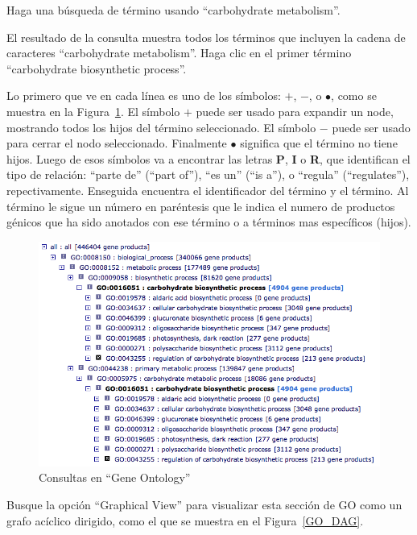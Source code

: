 \documentclass[letter,11pt]{book}
\begin{document}
Haga una búsqueda de término usando ``carbohydrate metabolism''.

El resultado de la consulta muestra todos los términos que incluyen la cadena de caracteres ``carbohydrate metabolism''.  Haga clic en el primer término ``carbohydrate biosynthetic process''.

Lo primero que ve en cada línea es uno de los símbolos: $+$, $-$, o $\bullet$, como se muestra en la Figura~\ref{QueryGO5}. El símbolo $+$ puede ser usado para expandir un node, mostrando todos los hijos del término seleccionado. El símbolo $-$ puede ser usado para cerrar el nodo seleccionado. Finalmente $\bullet$ significa que el término no tiene hijos. Luego de esos símbolos va a encontrar las letras \textbf{P}, \textbf{I} o \textbf{R}, que identifican el tipo de relación: ``parte de'' (``part of''), ``es un'' (``is a''), o ``regula'' (``regulates''), repectivamente. Enseguida encuentra el identificador del término y el término. Al término le sigue un número en paréntesis que le indica el numero de productos génicos que ha sido anotados con ese término o a términos mas específicos (hijos).

\begin{figure}[ht]
\centering
   \includegraphics[width=15cm]{Figs/QueryGO5.png}
  \caption{\label{QueryGO5}Consultas en ``Gene Ontology''}
\end{figure}

Busque la opción ``Graphical View'' para visualizar esta sección de GO como un grafo acíclico dirigido, como el que se muestra en el Figura~\ref{GO_DAG}.
\end{document}
